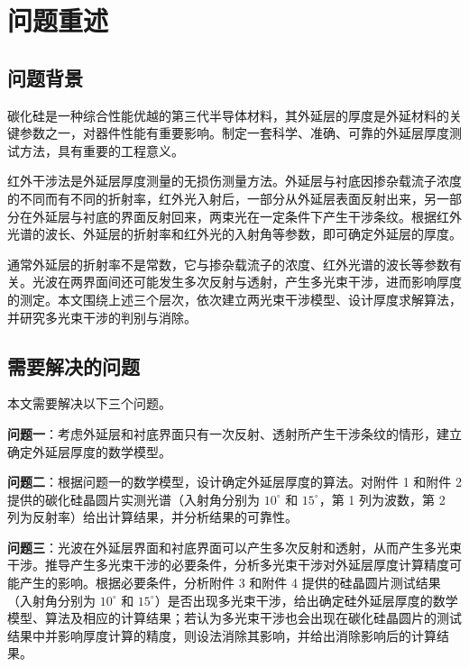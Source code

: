 \section{问题重述}

\subsection{问题背景}

碳化硅是一种综合性能优越的第三代半导体材料，其外延层的厚度是外延材料的关键参数之一，对器件性能有重要影响。制定一套科学、准确、可靠的外延层厚度测试方法，具有重要的工程意义。


红外干涉法是外延层厚度测量的无损伤测量方法。外延层与衬底因掺杂载流子浓度的不同而有不同的折射率，红外光入射后，一部分从外延层表面反射出来，另一部分在外延层与衬底的界面反射回来，两束光在一定条件下产生干涉条纹。根据红外光谱的波长、外延层的折射率和红外光的入射角等参数，即可确定外延层的厚度。


通常外延层的折射率不是常数，它与掺杂载流子的浓度、红外光谱的波长等参数有关。光波在两界面间还可能发生多次反射与透射，产生多光束干涉，进而影响厚度的测定。本文围绕上述三个层次，依次建立两光束干涉模型、设计厚度求解算法，并研究多光束干涉的判别与消除。

\subsection{需要解决的问题}

本文需要解决以下三个问题。


{\textbf{问题一}}：考虑外延层和衬底界面只有一次反射、透射所产生干涉条纹的情形，建立确定外延层厚度的数学模型。


{\textbf{问题二}}：根据问题一的数学模型，设计确定外延层厚度的算法。对附件 1 和附件 2 提供的碳化硅晶圆片实测光谱（入射角分别为 $10^\circ$ 和 $15^\circ$，第 1 列为波数，第 2 列为反射率）给出计算结果，并分析结果的可靠性。


{\textbf{问题三}}：光波在外延层界面和衬底界面可以产生多次反射和透射，从而产生多光束干涉。推导产生多光束干涉的必要条件，分析多光束干涉对外延层厚度计算精度可能产生的影响。根据必要条件，分析附件 3 和附件 4 提供的硅晶圆片测试结果（入射角分别为 $10^\circ$ 和 $15^\circ$）是否出现多光束干涉，给出确定硅外延层厚度的数学模型、算法及相应的计算结果；若认为多光束干涉也会出现在碳化硅晶圆片的测试结果中并影响厚度计算的精度，则设法消除其影响，并给出消除影响后的计算结果。
